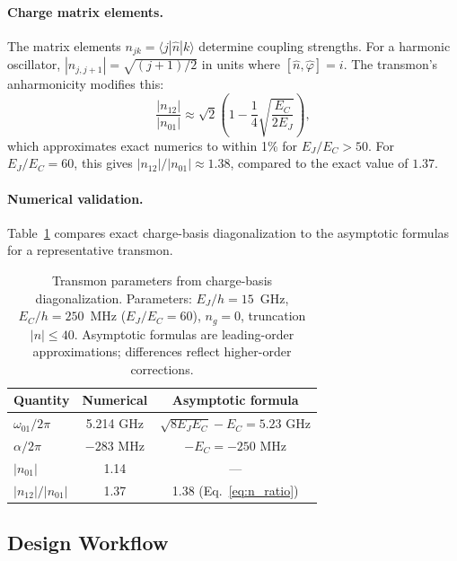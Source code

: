 \documentclass[reprint, floatfix, superscriptaddress, amsmath, amssymb, longbibliography]{revtex4-2}
\begin{document}
\paragraph{Charge matrix elements.} The matrix elements $n_{jk} = \langle j|\hat{n}|k\rangle$ determine coupling strengths. For a harmonic oscillator, $|n_{j,j+1}| = \sqrt{(j+1)/2}$ in units where $[\hat{n},\hat{\varphi}] = i$. The transmon's anharmonicity modifies this:
\begin{equation}
\frac{|n_{12}|}{|n_{01}|} \approx \sqrt{2}\left(1 - \frac{1}{4}\sqrt{\frac{E_C}{2E_J}}\right),
\label{eq:n_ratio}
\end{equation}
which approximates exact numerics to within 1\% for $E_J/E_C > 50$. For $E_J/E_C = 60$, this gives $|n_{12}|/|n_{01}| \approx 1.38$, compared to the exact value of $1.37$.

\paragraph{Numerical validation.} Table~\ref{tab:transmon_numerics} compares exact charge-basis diagonalization to the asymptotic formulas for a representative transmon.

\begin{table}[t]
\centering
\caption{Transmon parameters from charge-basis diagonalization. Parameters: $E_J/h = 15$~GHz, $E_C/h = 250$~MHz ($E_J/E_C = 60$), $n_g = 0$, truncation $|n| \leq 40$. Asymptotic formulas are leading-order approximations; differences reflect higher-order corrections.}
\label{tab:transmon_numerics}
\begin{tabular}{lcc}
\hline\hline
Quantity & Numerical & Asymptotic formula \\
\hline
$\omega_{01}/2\pi$ & 5.214 GHz & $\sqrt{8E_JE_C} - E_C = 5.23$ GHz \\
$\alpha/2\pi$ & $-283$ MHz & $-E_C = -250$ MHz \\
$|n_{01}|$ & 1.14 & --- \\
$|n_{12}|/|n_{01}|$ & 1.37 & 1.38 (Eq.~\ref{eq:n_ratio}) \\
\hline\hline
\end{tabular}
\end{table}

\subsection{Design Workflow}
\label{sec:design_workflow}
\end{document}

